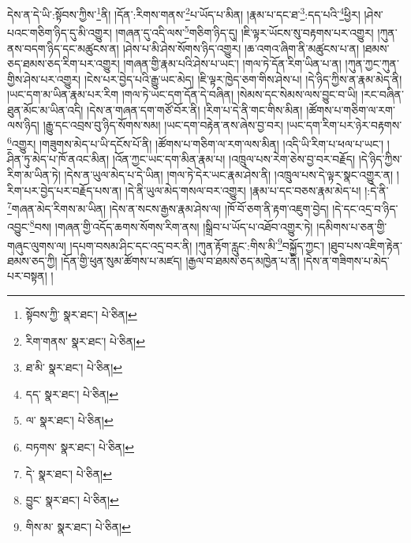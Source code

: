 དེས་ན་དེ་ཡི་:སྟོབས་ཀྱིས་\footnote{སྟོབས་ཀྱི་  སྣར་ཐང་།  པེ་ཅིན། }ནི། །དོན་:རིགས་གནས་\footnote{རིག་གནས་  སྣར་ཐང་།  པེ་ཅིན། }པ་ཡོད་པ་མིན། །རྣམ་པ་དང་ཐ་\footnote{ཐ་མི་  སྣར་ཐང་།  པེ་ཅིན། }:དད་པའི་\footnote{དད་  སྣར་ཐང་།  པེ་ཅིན། }ཕྱིར། །ཤེས་པའང་གཅིག་ཉིད་དུ་མི་འགྱུར། །གཞན་དུ་འདི་ལས་\footnote{ལ་  སྣར་ཐང་།  པེ་ཅིན། }གཅིག་ཉིད་དུ། །ཇི་ལྟར་ཡོངས་སུ་བརྟགས་པར་འགྱུར། །ཀུན་ནས་བདག་ཉིད་དང་མཚུངས་ན། །ཤེས་པ་མི་ཤེས་སོགས་ཉིད་འགྱུར། །ཆ་འགའ་ཞིག་ནི་མཚུངས་པ་ན། །ཐམས་ཅད་ཐམས་ཅད་རིག་པར་འགྱུར། །གཞན་གྱི་རྣམ་པའི་ཤེས་པ་ཡང་། །གལ་ཏེ་དོན་རིག་ཡིན་པ་ན། །ཀུན་ཀྱང་ཀུན་གྱིས་ཤེས་པར་འགྱུར། །ངེས་པར་བྱེད་པའི་རྒྱུ་ཡང་མེད། །ཇི་ལྟར་ཁྱེད་ཅག་གིས་ཤེས་པ། །དེ་ཉིད་ཀྱིས་ན་རྣམ་མེད་ནི། །ཡང་དག་མ་ཡིན་རྣམ་པར་རིག །གལ་ཏེ་ཡང་དག་དོན་དེ་བཞིན། །སེམས་དང་སེམས་ལས་བྱུང་བ་ཡི། །རང་བཞིན་ཐུན་མོང་མ་ཡིན་འདི། །དེས་ན་གཞན་དག་གཙོ་བོར་ནི། །རིག་པ་དེ་ནི་གང་གིས་མིན། །ཚོགས་པ་གཅིག་ལ་རག་ལས་ཉིད། །རྒྱུ་དང་འབྲས་བུ་ཉིད་སོགས་སམ། །ཡང་དག་བརྟེན་ནས་ཞེས་བྱ་བར། །ཡང་དག་རིག་པར་ཉེར་བརྟགས་\footnote{བཏགས་  སྣར་ཐང་།  པེ་ཅིན། }འགྱུར། །གཟུགས་མེད་པ་ཡི་དངོས་པོ་ནི། །ཚོགས་པ་གཅིག་ལ་རག་ལས་མིན། །འདི་ཡི་རིག་པ་ཕལ་པ་ཡང་། །ཤིན་ཏུ་མེད་པ་ཁོ་ནའང་མིན། །འོན་ཀྱང་ཡང་དག་མིན་རྣམ་པ། །འཁྲུལ་པས་རེག་ཅེས་བྱ་བར་བརྗོད། །དེ་ཉིད་ཀྱིས་རིག་མ་ཡིན་ཏེ། །དེས་ན་ཡུལ་མེད་པ་དེ་ཡིན། །གལ་ཏེ་དེར་ཡང་རྣམ་ཤེས་ནི། །འཁྲུལ་པས་དེ་ལྟར་སྣང་འགྱུར་ན། །རིག་པར་བྱེད་པར་བརྗོད་པས་ན། །དེ་ནི་ཡུལ་མེད་གསལ་བར་འགྱུར། །རྣམ་པ་དང་བཅས་རྣམ་མེད་པ། །:དེ་ནི་\footnote{དེ་  སྣར་ཐང་།  པེ་ཅིན། }གཞན་མེད་རིགས་མ་ཡིན། །དེས་ན་སངས་རྒྱས་རྣམ་ཤེས་ལ། །ཁོ་བོ་ཅག་ནི་རྟག་འཇུག་བྱེད། །དེ་དང་འདྲ་བ་ཉིད་འབྱུང་\footnote{བྱུང་  སྣར་ཐང་།  པེ་ཅིན། }བས། །གཞན་གྱི་འདོད་ཆགས་སོགས་རིག་ནས། །སྒྲིབ་པ་ཡོད་པ་འཐོབ་འགྱུར་ཏེ། །དམིགས་པ་ཅན་གྱི་གཞུང་ལུགས་ལ། །དཔག་བསམ་ཤིང་དང་འདྲ་བར་ནི། །ཀུན་རྟོག་རླུང་:གིས་མི་\footnote{གིས་མ་  སྣར་ཐང་།  པེ་ཅིན། }བསྐྱོད་ཀྱང་། །ཐུབ་པས་འཇིག་རྟེན་ཐམས་ཅད་ཀྱི། །དོན་གྱི་ཕུན་སུམ་ཚོགས་པ་མཛད། །རྒྱལ་བ་ཐམས་ཅད་མཁྱེན་པ་ནི། །དེས་ན་གཟིགས་པ་མེད་པར་བསྟན། །

